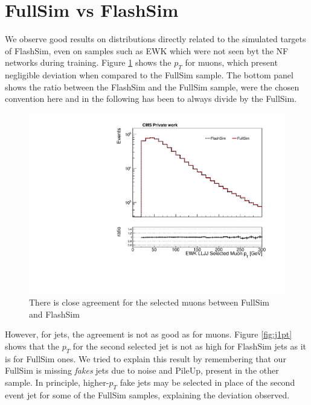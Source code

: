 \section{FullSim vs FlashSim}

We observe good results on distributions directly related to the simulated targets of FlashSim, even on samples such as EWK which were not seen byt the NF networks during training. Figure \ref{fig:selmuonpt} shows the $p_T$ for muons, which present negligible deviation when compared to the FullSim sample. The bottom panel shows the ratio between the FlashSim and the FullSim sample, were the chosen convention here and in the following has been to always divide by the FullSim.

\begin{figure}
    \centering
    \includegraphics[width=\linewidth]{gfx/ch6/EWK_LLJJ_SelectedMuon_pt____log.pdf}
    \caption[Selected muon $p_T$]{There is close agreement for the selected muons between FullSim and FlashSim}
    \label{fig:selmuonpt}
\end{figure}

However, for jets, the agreement is not as good as for muons. Figure \ref{fig:j1pt} shows that the $p_T$ for the second selected jet is not as high for FlashSim jets as it is for FullSim ones. We tried to explain this result by remembering that our FullSim is missing \emph{fakes} jets due to noise and PileUp, present in the other sample. In principle, higher-$p_T$ fake jets may be selected in place of the second event jet for some of the FullSim samples, explaining the deviation observed. 

